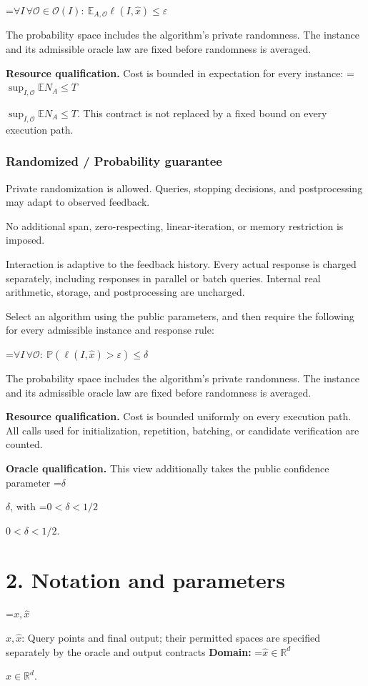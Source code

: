 \documentclass[10pt,a4paper]{article}
\newcommand{\AtlasMath}[1]{\par\begingroup\centering\setbox0=\hbox{$\displaystyle #1$}\ifdim\wd0>1.4\linewidth\typeout{ATLAS WIDE FORMULA: \the\wd0}\fi\ifdim\wd0>\linewidth\resizebox{\linewidth}{!}{\box0}\else\box0\fi\par\endgroup}
\newcommand{\AtlasInlineMath}[1]{\begingroup\setbox0=\hbox{$#1$}\ifdim\wd0>.4\linewidth\endgroup\AtlasMath{#1}\else\endgroup$#1$\fi}
\begin{document}
\AtlasMath{\forall I\,\forall\mathcal{O}\in\mathcal{O}(I):\ \mathbb{E}_{A,\mathcal{O}}\ell(I,\widehat{x})\le\varepsilon}


The probability space includes the algorithm's private randomness. The instance and its admissible oracle law are fixed before randomness is averaged.

\textbf{Resource qualification.} Cost is bounded in expectation for every instance: \AtlasInlineMath{\sup_{I,\mathcal O}\mathbb E N_A\le T}. This contract is not replaced by a fixed bound on every execution path.

\subsubsection{Randomized / Probability guarantee}
Private randomization is allowed. Queries, stopping decisions, and postprocessing may adapt to observed feedback.

No additional span, zero-respecting, linear-iteration, or memory restriction is imposed.

Interaction is adaptive to the feedback history. Every actual response is charged separately, including responses in parallel or batch queries. Internal real arithmetic, storage, and postprocessing are uncharged.

Select an algorithm using the public parameters, and then require the following for every admissible instance and response rule:


\AtlasMath{\forall I\,\forall\mathcal{O}:\ \mathbb{P}(\ell(I,\widehat{x})>\varepsilon)\le\delta}


The probability space includes the algorithm's private randomness. The instance and its admissible oracle law are fixed before randomness is averaged.

\textbf{Resource qualification.} Cost is bounded uniformly on every execution path. All calls used for initialization, repetition, batching, or candidate verification are counted.

\textbf{Oracle qualification.} This view additionally takes the public confidence parameter \AtlasInlineMath{\delta}, with \AtlasInlineMath{0<\delta<1/2}.

\section{2. Notation and parameters}
\AtlasInlineMath{x,\widehat{x}}: Query points and final output; their permitted spaces are specified separately by the oracle and output contracts \textbf{Domain:} \AtlasInlineMath{\widehat{x}\in \mathbb{R}^d}.
\end{document}
